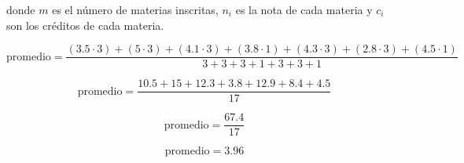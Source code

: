 \documentclass[letterpaper]{article}
\begin{document}
donde $m$ es el n\'umero de materias inscritas, $n_i$ es la nota de cada materia y $c_i$ son los cr\'editos de cada materia.

\begin{equation}
  \textrm{promedio} = \frac{(3.5\cdot3) + (5\cdot3) + (4.1\cdot3) + (3.8\cdot1) + (4.3\cdot3) + (2.8\cdot3) + (4.5\cdot1) }{3 + 3 + 3 + 1 + 3 + 3 + 1}
\end{equation}

\begin{equation}
  \textrm{promedio} = \frac{10.5 + 15 + 12.3 + 3.8 + 12.9 + 8.4 + 4.5}{17}
\end{equation}

\begin{equation}
  \textrm{promedio} = \frac{67.4}{17}
\end{equation}

\begin{equation}
  \textrm{promedio} = 3.96
\end{equation}
\end{document}
